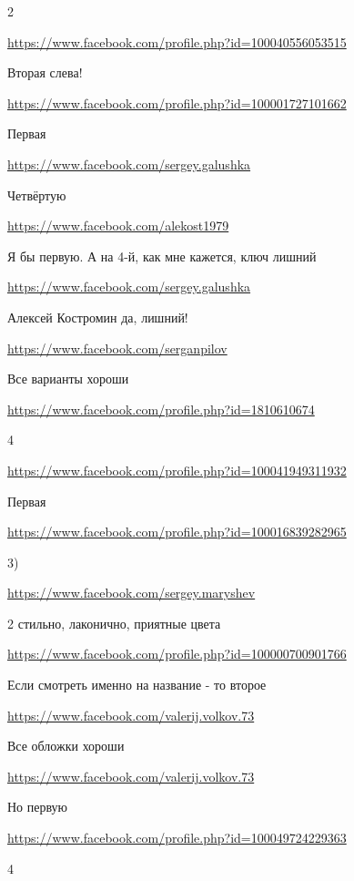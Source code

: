 \documentclass[a4paper,11pt]{extreport}
\begin{document}
\begin{itemize}
2

\url{https://www.facebook.com/profile.php?id=100040556053515}

Вторая слева!

\url{https://www.facebook.com/profile.php?id=100001727101662}

Первая

\url{https://www.facebook.com/sergey.galushka}

Четвёртую

\url{https://www.facebook.com/alekost1979}

Я бы первую. А на 4-й, как мне кажется, ключ лишний

\begin{itemize}
\url{https://www.facebook.com/sergey.galushka}

Алексей Костромин да, лишний!

\end{itemize}
\url{https://www.facebook.com/serganpilov}

Все варианты хороши

\url{https://www.facebook.com/profile.php?id=1810610674}

4

\url{https://www.facebook.com/profile.php?id=100041949311932}

Первая

\url{https://www.facebook.com/profile.php?id=100016839282965}

3)

\url{https://www.facebook.com/sergey.maryshev}

2 стильно, лаконично, приятные цвета

\url{https://www.facebook.com/profile.php?id=100000700901766}

Если смотреть именно на название - то второе

\url{https://www.facebook.com/valerij.volkov.73}

Все обложки хороши

\url{https://www.facebook.com/valerij.volkov.73}

Но первую

\url{https://www.facebook.com/profile.php?id=100049724229363}

4


\end{itemize}
\end{document}
